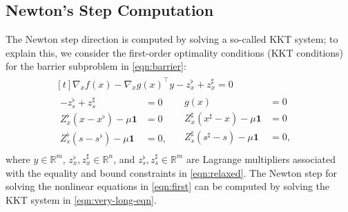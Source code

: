 \subsection{Newton's Step Computation}
The Newton step direction is computed by solving a so-called KKT system; to explain this, we consider the first-order optimality conditions (KKT conditions) for the barrier subproblem in \eqref{eqn:barrier}:
\begin{align}\label{eqn:first} 
  \begin{aligned}[t]
    \nabla_{x} f(x) - \nabla_{x}g(x)^\top y  - z_x^\flat  + z_x^\sharp = 0\;&\\
    \begin{aligned}
      - z_s^\flat  + z_s^\sharp  &= 0\\
      Z^\flat_x (x-x^\flat) - \mu\boldsymbol{1} &= 0\\
      Z^\flat_s (s-s^\flat) - \mu\boldsymbol{1}&= 0,
    \end{aligned}
    \quad
    \begin{aligned}
      g(x) &= 0\\
      Z^\sharp_x (x^\sharp-x) - \mu\boldsymbol{1}&= 0\\
      Z^\sharp_s (s^\sharp-s) - \mu\boldsymbol{1}&= 0,
    \end{aligned}&
  \end{aligned}
\end{align}
where $y\in\mathbb{R}^{m}$, $z_x^\flat,z_x^\sharp\in\mathbb{R}^{n}$,
and $z_s^\flat,z_s^\sharp\in\mathbb{R}^{m}$ are Lagrange multipliers
associated with the equality and bound constraints in
\eqref{eqn:relaxed}. The Newton step for solving the nonlinear
equations in \eqref{eqn:first} can be computed by solving the KKT system in \eqref{eqn:very-long-eqn}.
